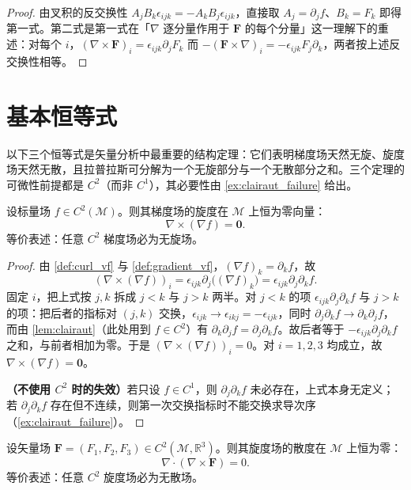 \begin{proof}
由叉积的反交换性 $A_jB_k\epsilon_{ijk}=-A_kB_j\epsilon_{ijk}$，直接取 $A_j=\partial_jf$、$B_k=F_k$ 即得第一式。第二式是第一式在「$\nabla$ 逐分量作用于 $\mathbf F$ 的每个分量」这一理解下的重述：对每个 $i$，$(\nabla\times\mathbf F)_i=\epsilon_{ijk}\partial_jF_k$ 而 $-(\mathbf F\times\nabla)_i=-\epsilon_{ijk}F_j\partial_k$，两者按上述反交换性相等。
\end{proof}

\section{基本恒等式}

以下三个恒等式是矢量分析中最重要的结构定理：它们表明梯度场天然无旋、旋度场天然无散，且拉普拉斯可分解为一个无旋部分与一个无散部分之和。三个定理的可微性前提都是 $C^2$（而非 $C^1$），其必要性由 \cref{ex:clairaut_failure} 给出。

\begin{theorem}[梯度场无旋度]\label{thm:curl_grad_zero}
设标量场 $f \in C^2(\mathcal{M})$。则其梯度场的旋度在 $\mathcal{M}$ 上恒为零向量：
\[
\nabla \times (\nabla f) = \mathbf{0}.
\]
等价表述：任意 $C^2$ 梯度场必为无旋场。
\end{theorem}

\begin{proof}
由 \cref{def:curl_vf} 与 \cref{def:gradient_vf}，$(\nabla f)_k = \partial_kf$，故
\[
(\nabla\times(\nabla f))_i = \epsilon_{ijk}\partial_j\bigl((\nabla f)_k\bigr) = \epsilon_{ijk}\partial_j\partial_kf .
\]
固定 $i$，把上式按 $j,k$ 拆成 $j<k$ 与 $j>k$ 两半。对 $j<k$ 的项 $\epsilon_{ijk}\partial_j\partial_kf$ 与 $j>k$ 的项：把后者的指标对 $(j,k)$ 交换，$\epsilon_{ijk}\to\epsilon_{ikj}=-\epsilon_{ijk}$，同时 $\partial_j\partial_kf\to\partial_k\partial_jf$，而由 \cref{lem:clairaut}（此处用到 $f\in C^2$）有 $\partial_k\partial_jf=\partial_j\partial_kf$。故后者等于 $-\epsilon_{ijk}\partial_j\partial_kf$ 之和，与前者相加为零。于是 $(\nabla\times(\nabla f))_i=0$。对 $i=1,2,3$ 均成立，故 $\nabla\times(\nabla f)=\mathbf 0$。

\textbf{（不使用 $C^2$ 时的失效）}若只设 $f\in C^1$，则 $\partial_j\partial_kf$ 未必存在，上式本身无定义；若 $\partial_j\partial_kf$ 存在但不连续，则第一次交换指标时不能交换求导次序（\cref{ex:clairaut_failure}）。
\end{proof}

\begin{theorem}[旋度场无散度]\label{thm:div_curl_zero}
设矢量场 $\mathbf{F} = (F_1, F_2, F_3) \in C^2(\mathcal{M}, \mathbb{R}^3)$。则其旋度场的散度在 $\mathcal M$ 上恒为零：
\[
\nabla \cdot (\nabla \times \mathbf{F}) = 0.
\]
等价表述：任意 $C^2$ 旋度场必为无散场。
\end{theorem}

